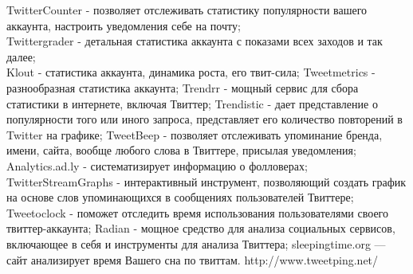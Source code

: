 \begin{chap1}
\begin{itemize}

TwitterCounter - позволяет отслеживать статистику популярности вашего аккаунта, настроить уведомления себе на почту;\\
Twittergrader - детальная статистика аккаунта с показами всех заходов и так далее;\\
Klout - статистика аккаунта, динамика роста, его твит-сила;
Tweetmetrics - разнообразная статистика аккаунта;
Trendrr - мощный сервис для сбора статистики в интернете, включая Твиттер;
Trendistic - дает представление о популярности того или иного запроса, представляет его количество повторений в Twitter на графике;
TweetBeep - позволяет отслеживать упоминание бренда, имени, сайта, вообще любого слова в Твиттере, присылая уведомления;
Analytics.ad.ly - систематизирует информацию о фолловерах;
TwitterStreamGraphs - интерактивный инструмент, позволяющий создать график на основе слов упоминающихся в сообщениях пользователей Твиттере;
Tweetoclock - поможет отследить время использования пользователями своего твиттер-аккаунта;
Radian - мощное средство для анализа социальных сервисов, включающее в себя и инструменты для анализа Твиттера;
sleepingtime.org — сайт анализирует время Вашего сна по твиттам.
http://www.tweetping.net/
\end{itemize}


\end{chap1}
